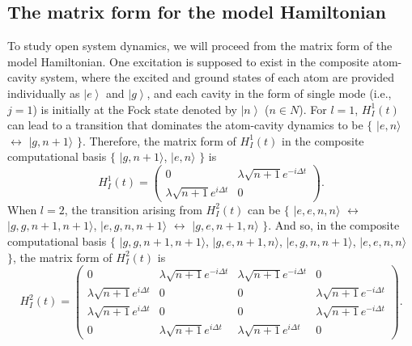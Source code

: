 \documentclass[
showpacs,  %
showkeys,  %
aps,       %
amsthm,    %
amsmath,   %
amsfonts,  %
amssymb    %
]{revtex4-1}          %
\begin{document}
\subsection{The matrix form for the model Hamiltonian}
\label{subsec:22}
To study open system dynamics, we will proceed from the matrix form of the model Hamiltonian. One excitation is supposed to exist in the composite atom-cavity system, where the excited and ground states of each atom are provided individually as $\left| e \right\rangle$ and $\left| g \right\rangle$, and each cavity in the form of single mode (i.e., $j=1$) is initially at the Fock state denoted by $\left| n \right\rangle$ ($n\in{N}$). For $l=1$, ${H^1_I}(t)$ can lead to a transition that dominates the atom-cavity dynamics to be $\{$ $|e,n\rangle$ $\leftrightarrow$ $|g,n+1\rangle$ $\}$. Therefore, the matrix form of ${H^1_I}(t)$ in the composite computational basis $\{$ $|g,n+1\rangle$, $|e,n\rangle$ $\}$ is
\begin{equation}
\label{e6}
{H^1_I}(t) = \left( {\begin{array}{*{20}{c}}
0&{\lambda \sqrt {n + 1} {e^{ - i\Delta t}}}\\
{\lambda \sqrt {n + 1} {e^{i\Delta t}}}&0
\end{array}} \right).
\end{equation}
When $l=2$, the transition arising from ${H^2_I}(t)$ can be $\{$ $|e,e,n,n\rangle$ $\leftrightarrow$ $|g,g,n+1,n+1\rangle$, $|e,g,n,n+1\rangle$ $\leftrightarrow$ $|g,e,n+1,n\rangle$ $\}$. And so, in the composite computational basis $\{$ $|g,g,n+1,n+1\rangle$, $|g,e,n+1,n\rangle$, $|e,g,n,n+1\rangle$, $|e,e,n,n\rangle$ $\}$, the matrix form of ${H^2_I}(t)$ is
\begin{equation}
\label{e7}
{H^2_I}(t) = \left( {\begin{array}{*{20}{c}}
0&{\lambda \sqrt {n + 1} {e^{ - i\Delta t}}}&{\lambda \sqrt {n + 1} {e^{ - i\Delta t}}}&0\\
{\lambda \sqrt {n + 1} {e^{i\Delta t}}}&0&0&{\lambda \sqrt {n + 1} {e^{ - i\Delta t}}}\\
{\lambda \sqrt {n + 1} {e^{i\Delta t}}}&0&0&{\lambda \sqrt {n + 1} {e^{ - i\Delta t}}}\\
0&{\lambda \sqrt {n + 1} {e^{i\Delta t}}}&{\lambda \sqrt {n + 1} {e^{i\Delta t}}}&0
\end{array}} \right).
\end{equation}
\end{document}
